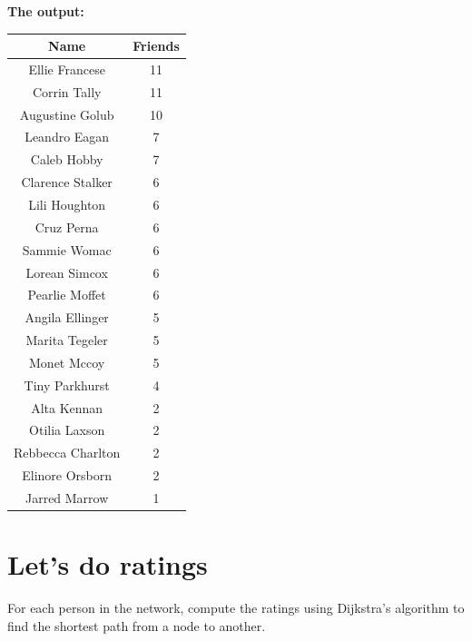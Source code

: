 \documentclass{article}
\begin{document}
    \vspace{2em}

    \begin{table}[H]
      \centering
      \textbf{The output:}\\
      \vspace{1em}
      \begin{tabular}{|c|c|}
        \hline
        \textbf{Name} & \textbf{Friends} \\ \hline
        Ellie Francese & 11 \\ \hline
        Corrin Tally   & 11 \\ \hline
        Augustine Golub & 10 \\ \hline
        Leandro Eagan  &  7 \\ \hline
        Caleb Hobby    &  7 \\ \hline
        Clarence Stalker &  6 \\ \hline
        Lili Houghton  &  6 \\ \hline
        Cruz Perna     &  6 \\ \hline
        Sammie Womac   &  6 \\ \hline
        Lorean Simcox  &  6 \\ \hline
        Pearlie Moffet &  6 \\ \hline
        Angila Ellinger &  5 \\ \hline
        Marita Tegeler &  5 \\ \hline
        Monet Mccoy    &  5 \\ \hline
        Tiny Parkhurst &  4 \\ \hline
        Alta Kennan    &  2 \\ \hline
        Otilia Laxson  &  2 \\ \hline
        Rebbecca Charlton & 2 \\ \hline
        Elinore Orsborn &  2 \\ \hline
        Jarred Marrow  &  1 \\ \hline
      \end{tabular}
    \end{table}


  \newpage


    \section{Let's do ratings}
      For each person in the network, compute the ratings using Dijkstra's
      algorithm to find the shortest path from a node to another.\\
\end{document}

